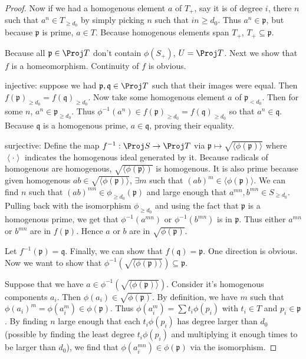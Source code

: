 \begin{proof}
	Now if we had a homogenous element $a $ of $T_+ $, say it is of degree $i $, there $n $ such that $a^n \in T_{\ge d_{0}} $ by simply picking $n $ such that $in \ge d_{0} $.
	Thus $a^n \in \mathfrak{p} $, but because $\mathfrak{p} $ is prime, $a \in T $.
	Because homogenous elements span $T_+ $, $T_+ \subseteq \mathfrak{p} $.

	Because all $\mathfrak{p}\in \Proj T $ don't contain $\phi(S_+)$, $U = \Proj T $.
	Next we show that $f $ is a homeomorphism.
	Continuity of $f $ is obvious.

	injective: suppose we had $\mathfrak{p},\mathfrak{q}\in \Proj T $ such that their images were equal.
	Then $f(\mathfrak{p})_{\ge d_{0}} = f(\mathfrak{q})_{\ge d_{0}} $.
	Now take some homogenous element $a $ of $\mathfrak{p}_{< d_{0}} $.
	Then for some $n $, $a^n \in \mathfrak{p}_{\ge d_{0}} $.
	Thus $\phi ^{-1}(a^n) \in f(\mathfrak{p})_{\ge d_{0}} = f(\mathfrak{q})_{\ge d_{0}} $ so that $a^n \in \mathfrak{q} $.
	Because $\mathfrak{q}$ is a homogenous prime, $a \in \mathfrak{q}$, proving their equality.

	surjective: 
	Define the map $f^{-1}:\Proj S\to \Proj T $ via $\mathfrak{p} \mapsto \sqrt{\langle \phi(\mathfrak{p})\rangle} $ where $\left< \cdot \right> $ indicates the homogenous ideal generated by it.
	Because radicals of homogenous are homogenous, $\sqrt{\langle\phi (\mathfrak{p}\rangle)}  $ is homogenous.
	It is also prime because given homogenous $ab \in \sqrt{\langle\phi (\mathfrak{p})\rangle} $, $\exists m $ such that $(ab)^m \in \langle\phi (\mathfrak{p}) \rangle$.
	We can find $n $ such that $(ab)^{mn} \in \phi _{\ge d_{0}}(\mathfrak{p}) $ and large enough that $a^{mn}, b^{mn} \in S_{\ge d_{0}}  $.
	Pulling back with the isomorphism $\phi _{\ge d_{0}} $ and using the fact that $\mathfrak{p} $ is a homogenous prime, we get that $\phi ^{-1} (a^{mn})$ or $\phi ^{-1}(b^{mn})$ is in $\mathfrak{p} $.
	Thus either $a^{mn}  $ or $b^{mn}  $ are in $f(\mathfrak{p}) $.
	Hence $a $ or $b $ are in $\sqrt{\phi (\mathfrak{p})} $.

	Let $f^{-1}(\mathfrak{p}) = \mathfrak{q} $.
	Finally, we can show that $f(\mathfrak{q}) = \mathfrak{p} $.
	One direction is obvious.
	Now we want to show that $\phi ^{-1}(\sqrt{\langle\phi (\mathfrak{p})\rangle} ) \subseteq \mathfrak{p} $.

	Suppose that we have $a \in \phi ^{-1}(\sqrt{\langle\phi (\mathfrak{p})\rangle} ) $.
	Consider it's homogenous components $a_i $.
	Then $\phi (a_i) \in \sqrt{\phi (\mathfrak{p})}$.
	By definition, we have $m $ such that $\phi (a_i)^m = \phi(a_i^m) \in \phi (\mathfrak{p}) $.
	Thus $\phi(a_i^m) = \sum t_i \phi(p_i) $ with $t_i \in T $ and $p_i \in \mathfrak{p} $.
	By finding $n $ large enough that each $t_i \phi (p_i) $ has degree larger than $d_{0} $ (possible by finding the least degree $t_i \phi (p_i) $ and multiplying it enough times to be larger than $d_{0} $), we find that $\phi (a_i^{mn}) \in \phi(\mathfrak{p})$ via the isomorphism.


\end{proof}
